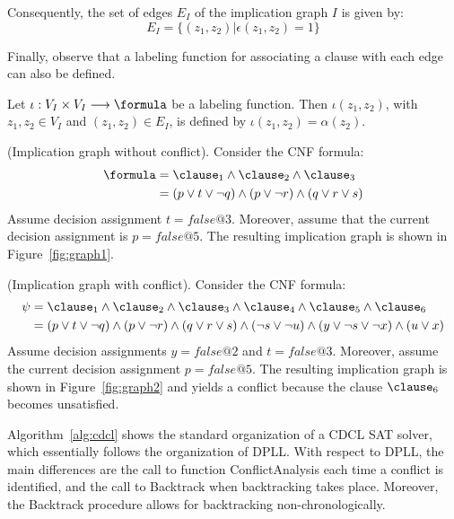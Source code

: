 Consequently, the set of edges $E_I$ of the implication graph $I$ is given by:
\begin{equation}
    E_I = \{ (z_1, z_2) | \epsilon(z_1, z_2) = 1\}
\end{equation}

Finally, observe that a labeling function for associating a clause with each
edge can also be defined. 

\begin{definition}
    Let $\iota : V_I \times V_I \longrightarrow \formula$ be a labeling
    function. Then $\iota(z_1, z_2)$, with $z_1, z_2 \in V_I$ and $(z_1, z_2)
    \in E_I$, is defined by $\iota(z_1, z_2) = \alpha(z_2)$.
\end{definition}

\begin{example}
    \label{ex:graph1}
    (Implication graph without conflict). Consider the CNF formula:
    \begin{align*}
        \formula & = \clause_1 \land \clause_2 \land \clause_3\\
                 & = (p \lor t \lor \neg q) \land (p \lor \neg r) \land (q \lor r \lor s)
    \end{align*}
    Assume decision assignment $t = false@3$. Moreover, assume that the current
    decision assignment is $p = false@5$. The resulting implication graph is
    shown in Figure~\ref{fig:graph1}.
    
\end{example}

\begin{example}
    \label{ex:graph2}
    (Implication graph with conflict). Consider the CNF formula:
    \begin{align*}
        \psi & = \clause_1 \land \clause_2 \land \clause_3 \land \clause_4 \land \clause_5 \land \clause_6  \\
                 & = (p \lor t \lor \neg q) \land (p \lor \neg r) \land (q \lor r \lor s) \land (\neg s \lor \neg u) \land (y \lor \neg s \lor \neg x) \land (u \lor x)
    \end{align*}
    Assume decision assignments $y = false@2$ and $t = false@3$. Moreover,
    assume the current decision assignment $p = false@5$. The resulting
    implication graph is shown in Figure~\ref{fig:graph2} and yields a conflict
    because the clause $\clause_6$ becomes unsatisfied.
    
\end{example}

Algorithm~\ref{alg:cdcl} shows the standard organization of a CDCL SAT solver,
which essentially follows the organization of DPLL. With respect to DPLL, the
main differences are the call to function ConflictAnalysis each time a conflict
is identified, and the call to Backtrack when backtracking takes place.
Moreover, the Backtrack procedure allows for backtracking non-chronologically. 

